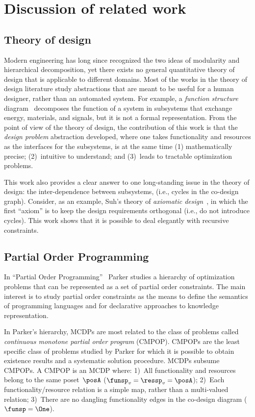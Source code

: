 \section{Discussion of related work\label{sec:Discussion-of-related}}

\subsection{Theory of design}

Modern engineering has long since recognized the two ideas of modularity
and hierarchical decomposition, yet there exists no general quantitative
theory of design that is applicable to different domains. Most of
the works in the theory of design literature study abstractions that
are meant to be useful for a human designer, rather than an automated
system. For example, a \emph{function structure }diagram~\cite[p. 32]{pahl07}
decomposes the function of a system in subsystems that exchange energy,
materials, and signals, but it is not a formal representation. From
the point of view of the theory of design, the contribution of this
work is that the \emph{design problem }abstraction developed, where
one takes functionality and resources as the interfaces for the subsystems,
is at the same time (1) mathematically precise; (2)~intuitive to
understand; and (3)~leads to tractable optimization problems.

This work also provides a clear answer to one long-standing issue
in the theory of design: the inter-dependence between subsystems,
(i.e., cycles in the co-design graph). Consider, as an example, Suh's
theory of \emph{axiomatic design~}\cite{suh01}, in which the first
``axiom'' is to keep the design requirements orthogonal (i.e., do
not introduce cycles). This work shows that it is possible to deal
elegantly with recursive constraints.

\subsection{Partial Order Programming}

In ``Partial Order Programming''~\cite{parkerjr89partial} Parker
studies a hierarchy of optimization problems that can be represented
as a set of partial order constraints. The main interest is to study
partial order constraints as the means to define the semantics of
programming languages and for declarative approaches to knowledge
representation.

In Parker's hierarchy, MCDPs are most related to the class of problems
called \emph{continuous monotone partial order program} (CMPOP). CMPOPs
are the least specific class of problems studied by Parker for which
it is possible to obtain existence results and a systematic solution
procedure. MCDPs subsume CMPOPs. A CMPOP is an MCDP where: 1)~All
functionality and resources belong to the same poset~$\posA$ ($\funsp_{v}=\ressp_{v}=\posA$);
2)~Each functionality/resource relation is a simple map, rather than
a multi-valued relation; 3)~There are no dangling functionality edges
in the co-design diagram ($\funsp=\One$).

